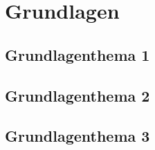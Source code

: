 \section{Grundlagen}

\subsection{Grundlagenthema 1}


\subsection{Grundlagenthema 2}


\subsection{Grundlagenthema 3}
